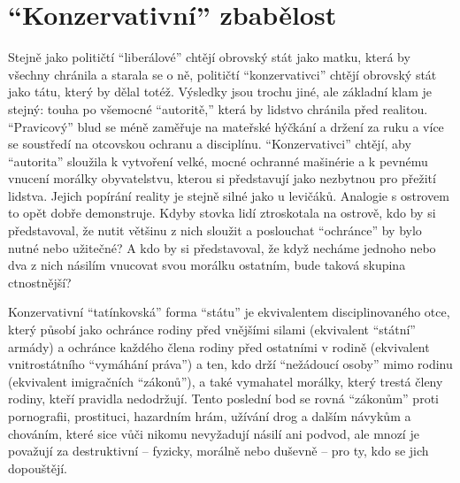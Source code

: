 \documentclass{book}
\begin{document}
\section{\enquote{Konzervativní} zbabělost}

Stejně jako političtí \enquote{liberálové} chtějí obrovský stát jako matku, která by všechny chránila a starala se o ně, političtí \enquote{konzervativci} chtějí obrovský stát jako tátu, který by dělal totéž. Výsledky jsou trochu jiné, ale základní klam je stejný: touha po všemocné \enquote{autoritě,} která by lidstvo chránila před realitou. \enquote{Pravicový} blud se méně zaměřuje na mateřské hýčkání a držení za ruku a více se soustředí na otcovskou ochranu a disciplínu. \enquote{Konzervativci} chtějí, aby \enquote{autorita} sloužila k vytvoření velké, mocné ochranné mašinérie a k pevnému vnucení morálky obyvatelstvu, kterou si představují jako nezbytnou pro přežití lidstva. Jejich popírání reality je stejně silné jako u levičáků. Analogie s ostrovem to opět dobře demonstruje. Kdyby stovka lidí ztroskotala na ostrově, kdo by si představoval, že nutit většinu z nich sloužit a poslouchat \enquote{ochránce} by bylo nutné nebo užitečné? A kdo by si představoval, že když necháme jednoho nebo dva z nich násilím vnucovat svou morálku ostatním, bude taková skupina ctnostnější?

Konzervativní \enquote{tatínkovská} forma \enquote{státu} je ekvivalentem disciplinovaného otce, který působí jako ochránce rodiny před vnějšími silami (ekvivalent \enquote{státní} armády) a ochránce každého člena rodiny před ostatními v rodině (ekvivalent vnitrostátního \enquote{vymáhání práva}) a ten, kdo drží \enquote{nežádoucí osoby} mimo rodinu (ekvivalent imigračních \enquote{zákonů}), a také vymahatel morálky, který trestá členy rodiny, kteří pravidla nedodržují. Tento poslední bod se rovná \enquote{zákonům} proti pornografii, prostituci, hazardním hrám, užívání drog a dalším návykům a chováním, které sice vůči nikomu nevyžadují násilí ani podvod, ale mnozí je považují za destruktivní -- fyzicky, morálně nebo duševně -- pro ty, kdo se jich dopouštějí.
\end{document}
